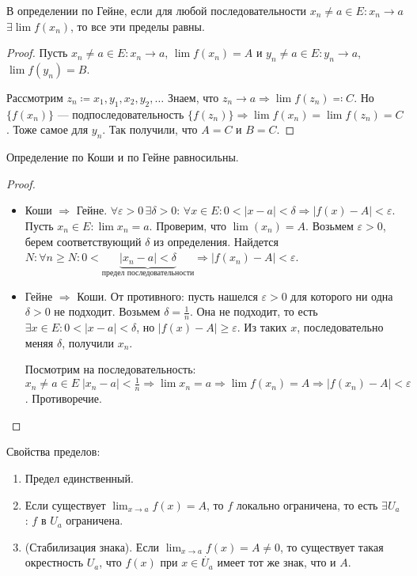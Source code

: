 \begin{property}
    В определении по Гейне, если для любой последовательности $x_n \neq a \in E: x_n \to a$  $\exists \lim f(x_n)$, то все эти пределы равны.
\end{property}
\begin{proof}
    Пусть $x_n \neq a \in E: x_n \to a$, $\lim f(x_n) = A$ и $y_n \neq a \in E:  y_n \to a$,  $\lim f(y_n) = B$.

    Рассмотрим  $z_n \coloneqq x_1, y_1, x_2, y_2,\ldots$ Знаем, что $z_n \to a \Rightarrow \lim f(z_n) \eqqcolon C$. Но $\{f(x_n)\}$ --- подпоследовательность  $\{f(z_n)\} \Rightarrow \lim f(x_n) = \lim f(z_n) = C$. Тоже самое для  $y_n$. Так получили, что $A = C$ и $B = C$.
\end{proof}
\begin{theorem}
    Определение по Коши и по Гейне равносильны.
\end{theorem}
\begin{proof}
    \slashn
    \begin{itemize}
        \item Коши $\Rightarrow$ Гейне. $\forall \varepsilon > 0\, \exists \delta >0: \, \forall x \in E: 0 < |x-a| < \delta \Rightarrow |f(x) - A| < \varepsilon$. Пусть  $x_n \in E: \lim x_n = a$. Проверим, что  $\lim(x_n) = A$. Возьмем $\varepsilon > 0$, берем соответствующий  $\delta$ из определения. Найдется $N: \forall n \ge N: 0 < \underbrace{|x_n-a|<\delta}_{\text{предел последовательности}} \Rightarrow |f(x_n) - A| < \varepsilon$. 
        \item Гейне $\Rightarrow$ Коши. От противного: пусть нашелся  $\varepsilon > 0$ для которого ни одна  $\delta > 0$ не подходит. Возьмем $\delta =\frac{1}{n}$. Она не подходит, то есть $\exists x \in E: 0 < |x-a| < \delta$, но  $|f(x) - A| \ge \varepsilon$. Из таких $x$, последовательно меняя $\delta$, получили $x_n$. 

            Посмотрим на последовательность:  $x_n \neq a \in E\; |x_n-a| < \frac{1}{n} \Rightarrow \lim x_n = a \Rightarrow \lim f(x_n) = A \Rightarrow |f(x_n) - A| < \varepsilon$. Противоречие. 
    \end{itemize}
\end{proof}
\slashn
Свойства пределов:
\begin{enumerate}
    \item Предел единственный.
    \item Если существует $\lim_{x\to a} f(x) = A$, то  $f$ локально ограничена, то есть $\exists U_a$ : $f$ в $U_a$ ограничена.
    \item (Стабилизация знака). Если  $\lim_{x\to a} f(x) = A \neq 0$, то существует такая окрестность  $U_a$, что  $f(x)$ при  $x \in \dot{U_a}$ имеет тот же знак, что и  $A$.
\end{enumerate}
